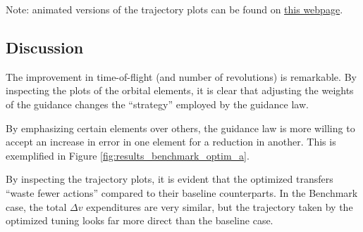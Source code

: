 {
\Large
Note: animated versions of the trajectory plots can be found on \href{https://github.com/itchono/SLyGA/wiki/Case-Outputs}{this webpage}.
}

\subsection{Discussion}
\label{sec:discussion}
The improvement in time-of-flight (and number of revolutions) is remarkable. By inspecting the plots of the orbital elements, it is clear that adjusting the weights of the guidance changes the ``strategy'' employed by the guidance law.

By emphasizing certain elements over others, the guidance law is more willing to accept an increase in error in one element for a reduction in another. This is exemplified in Figure \ref{fig:results_benchmark_optim_a}.

By inspecting the trajectory plots, it is evident that the optimized transfers ``waste fewer actions'' compared to their baseline counterparts. In the Benchmark case, the total $\Delta v$ expenditures are very similar, but the trajectory taken by the optimized tuning looks far more direct than the baseline case.
